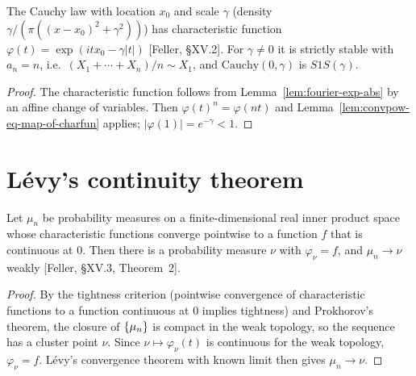 \begin{theorem}
  \label{thm:cauchy-stable}
  \leanok
  The Cauchy law with location $x_0$ and scale $\gamma$ (density
  $\gamma/(\pi((x - x_0)^2 + \gamma^2))$) has characteristic function
  $\varphi(t) = \exp(i t x_0 - \gamma |t|)$ [Feller, \S XV.2]. For $\gamma \ne 0$ it is strictly
  stable with $a_n = n$, i.e.\ $(X_1 + \cdots + X_n)/n \sim X_1$, and $\mathrm{Cauchy}(0, \gamma)$
  is $S1S(\gamma)$.
\end{theorem}
\begin{proof}
  \leanok
  The characteristic function follows from Lemma~\ref{lem:fourier-exp-abs} by an affine change
  of variables. Then $\varphi(t)^n = \varphi(nt)$ and Lemma~\ref{lem:convpow-eq-map-of-charfun}
  applies; $|\varphi(1)| = e^{-\gamma} < 1$.
\end{proof}

\section{Lévy's continuity theorem}

\begin{theorem}
  \label{thm:levy-continuity}
  \leanok
  Let $\mu_n$ be probability measures on a finite-dimensional real inner product space whose
  characteristic functions converge pointwise to a function $f$ that is continuous at $0$. Then
  there is a probability measure $\nu$ with $\varphi_\nu = f$, and $\mu_n \to \nu$ weakly
  [Feller, \S XV.3, Theorem~2].
\end{theorem}
\begin{proof}
  \leanok
  By the tightness criterion (pointwise convergence of characteristic functions to a function
  continuous at $0$ implies tightness) and Prokhorov's theorem, the closure of
  $\left\{ \mu_n \right\}$ is compact in the weak topology, so the sequence has a cluster point $\nu$. Since
  $\nu \mapsto \varphi_\nu(t)$ is continuous for the weak topology, $\varphi_\nu = f$. Lévy's
  convergence theorem with known limit then gives $\mu_n \to \nu$.
\end{proof}

